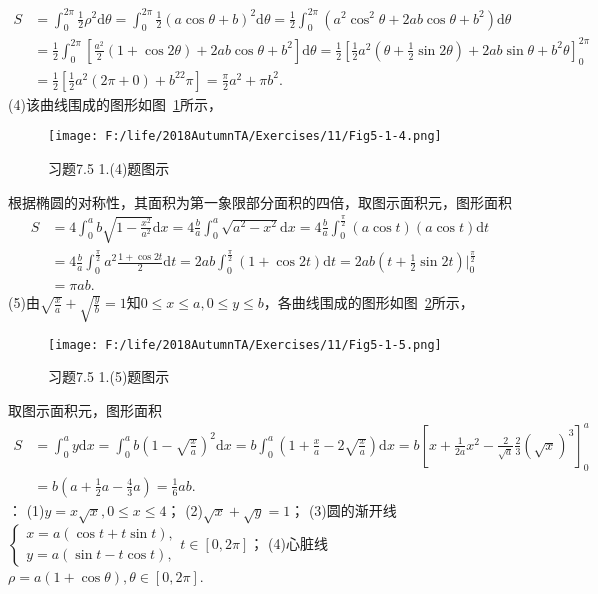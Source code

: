 \documentclass[12pt,UTF8]{ctexart}
\begin{document}
\begin{enumerate}
\[\begin{split}
S&=\int_0^{2\pi}\frac12\rho^2\mathrm d\theta=\int_0^{2\pi}\frac12(a\cos\theta+b)^2\mathrm d\theta=\frac12\int_0^{2\pi}(a^2\cos^2\theta+2ab\cos\theta+b^2)\mathrm d\theta\\
&=\frac12\int_0^{2\pi}[\frac{a^2}2(1+\cos2\theta)+2ab\cos\theta+b^2]\mathrm d\theta=\frac12[\frac12a^2(\theta+\frac12\sin2\theta)+2ab\sin\theta+b^2\theta]_0^{2\pi}\\
&=\frac12[\frac12a^2(2\pi+0)+b^22\pi]=\frac\pi2a^2+\pi b^2.
\end{split}\]
(4)该曲线围成的图形如图~\ref{5-1-4}所示，
\begin{figure}[H]
\begin{center}
\texttt{[image: F:/life/2018AutumnTA/Exercises/11/Fig5-1-4.png]}
\end{center}
\caption{习题7.5 1.(4)题图示}
\label{5-1-4}
\end{figure}
根据椭圆的对称性，其面积为第一象限部分面积的四倍，取图示面积元，图形面积
\[\begin{split}
S&=4\int_0^ab\sqrt{1-\frac{x^2}{a^2}}\mathrm dx=4\frac ba\int_0^a\sqrt{a^2-x^2}\mathrm dx=4\frac ba\int_0^{\frac\pi2}(a\cos t)(a\cos t)\mathrm dt\\
&=4\frac ba\int_0^{\frac\pi2}a^2\frac{1+\cos2t}2\mathrm dt=2ab\int_0^{\frac\pi2}(1+\cos2t)\mathrm dt=2ab(t+\frac12\sin2t)\Big|_0^\frac\pi2\\
&=\pi ab.
\end{split}\]
(5)由$\sqrt{\frac xa}+\sqrt{\frac yb}=1$知$0\leq x\leq a,0\leq y\leq b$，各曲线围成的图形如图~\ref{5-1-5}所示，
\begin{figure}[H]
\begin{center}
\texttt{[image: F:/life/2018AutumnTA/Exercises/11/Fig5-1-5.png]}
\end{center}
\caption{习题7.5 1.(5)题图示}
\label{5-1-5}
\end{figure}
取图示面积元，图形面积
\[\begin{split}
S&=\int_0^ay\mathrm dx=\int_0^ab(1-\sqrt{\frac xa})^2\mathrm dx=b\int_0^a(1+\frac xa-2\sqrt{\frac xa})\mathrm dx=b[x+\frac 1{2a}x^2-\frac2{\sqrt a}\frac23(\sqrt x)^3]_0^a\\
&=b(a+\frac12a-\frac43a)=\frac16ab.
\end{split}\]
：
\newline
(1)$y=x\sqrt x,0\leq x\leq4$；
\newline
(2)$\sqrt x+\sqrt y=1$；
\newline
(3)圆的渐开线$\begin{cases}
x=a(\cos t+t\sin t),\\
y=a(\sin t-t\cos t),
\end{cases}t\in[0,2\pi]$；
\newline
(4)心脏线$\rho=a(1+\cos\theta),\theta\in[0,2\pi]$.


\end{enumerate}
\end{document}
